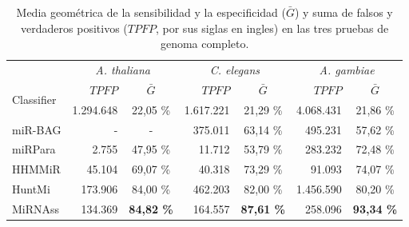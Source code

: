\begin{table}[tpb]
	\footnotesize
	\centering
	\caption[Resultados en genoma completo]{Media geométrica de la sensibilidad y la especificidad ($\bar{G}$) y suma de falsos y verdaderos positivos
		($TPFP$, por sus siglas en ingles) en las tres pruebas de genoma completo.
	\label{tab:wholegenome}}
	\begin{tabular}{@{}lrcrcrc@{}} \toprule
		&	\multicolumn{2}{c}{\textit{A. thaliana}}
		&	\multicolumn{2}{c}{\textit{C. elegans}}
		&	\multicolumn{2}{c}{\textit{A. gambiae}} \\
		\multirow{2}{*}{Classifier}	&	 $TPFP$		&	 $\bar{G}$
						&	 $TPFP$			&	 $\bar{G}$
						&	 $TPFP$			&	 $\bar{G}$	\\\midrule
		{\small Mirident}	&	 1.294.648		&	 22,05 \%
					&	 1.617.221		&	 21,29 \%
					&	 4.068.431		&	 21,86 \%	\\
		{\small miR-BAG}	&	 -			&	 -
					&	 375.011		&	 63,14 \%
					&	 495.231		&	 57,62 \%	\\
		{\small miRPara}	&	 2.755			&	 47,95 \%
					&	 11.712			&	 53,79 \%
					&	 283.232		&	 72,48 \%	\\
		{\small HHMMiR}		&	 45.104			&	 69,07 \%
					&	 40.318			&	 73,29 \%
					&	 91.093			&	 74,07 \%	\\
		{\small HuntMi}		&	 173.906		&	 84,00 \%
					&	 462.203		&	 82,00 \%
					&	 1.456.590		&	 80,20 \%	\\
		{\small MiRNAss}	&	134.369		&	\textbf{84,82 \%}
					&	 164.557		&	 \textbf{87,61 \%}
					&	 258.096		&	 \textbf{93,34 \%}	\\\bottomrule
	\end{tabular}
\end{table}
